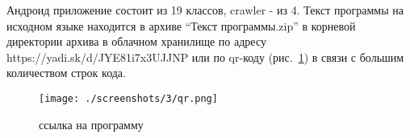 Андроид приложение состоит из 19 классов, crawler - из 4.
Текст программы на исходном языке находится в архиве “Текст
программы.zip” в корневой директории архива в облачном хранилище по
адресу https://yadi.sk/d/JYE81i7x3UJJNP или по qr-коду (рис.~\ref{qr}) в связи с большим количеством строк
кода.

\begin{figure}[h!]
    \centering
    \texttt{[image: ./screenshots/3/qr.png]}
    \caption{ссылка на программу}
    \label{qr}
\end{figure}

